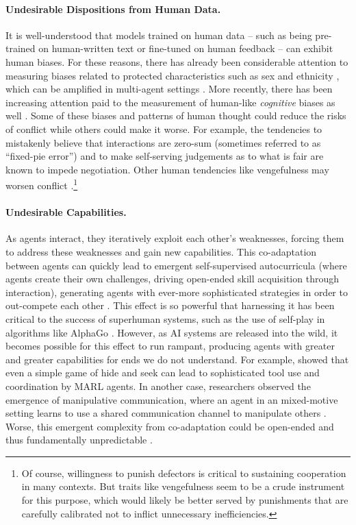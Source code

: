 \paragraph{Undesirable Dispositions from Human Data.}
It is well-understood that models trained on human data -- such as being pre-trained on human-written text or fine-tuned on human feedback -- can exhibit {human biases}.
For these reasons, there has already been considerable attention to measuring biases related to protected characteristics such as sex and ethnicity \citep[e.g.,][]{Nadeem2020-pi,Nangia2020-gl,Liang2021-uh,Ferrara2023-ix}, which can be amplified in multi-agent settings \citep[see also ]{Acerbi2023}.
More recently, there has been increasing attention paid to the measurement of human-like \textit{cognitive} biases as well \citep{Jones2022-or,Itzhak2023-yc,Talboy2023-wd, mazeika2025utilityengineeringanalyzingcontrolling}. 
Some of these biases and patterns of human thought could reduce the risks of conflict while others could make it worse.
For example, the tendencies to mistakenly believe that 
interactions are zero-sum (sometimes referred to 
as ``fixed-pie error'') and to make self-serving 
judgements as to what is fair \citep{Caputo2013-cm} are 
known to impede negotiation.
Other human tendencies like vengefulness \citep{Jackson2019-zp} may worsen conflict \citep{Lowenheim2008-wv}.\footnote{Of course, willingness to punish defectors is critical to sustaining cooperation in many contexts. But traits like vengefulness seem to be a crude instrument for this purpose, which would likely be better served by punishments that are carefully calibrated not to inflict unnecessary inefficiencies.}


\paragraph{Undesirable Capabilities.}
As agents interact, they iteratively exploit each other's weaknesses, forcing them to address these weaknesses and gain new capabilities. This co-adaptation between agents can quickly lead to emergent self-supervised autocurricula (where agents create their own challenges, driving open-ended skill acquisition through interaction), generating agents with ever-more sophisticated strategies in order to out-compete each other \citep{leibo2019autocurricula}. This effect is so powerful that harnessing it has been critical to the success of superhuman systems, such as the use of self-play in algorithms like AlphaGo \citep{Silver2016}.
However, as AI systems are released into the wild, it becomes possible for this effect to run rampant, producing agents with greater and greater capabilities for ends we do not understand. 
For example, \citet{Baker2019} showed that even a simple game of hide and seek can lead to sophisticated tool use and coordination by MARL agents. 
In another case, researchers observed the emergence of manipulative communication, where an agent in an mixed-motive setting learns to use a shared communication channel to manipulate others \citep{blumenkamp2021emergence}. Worse, this emergent complexity from co-adaptation could be open-ended and thus fundamentally unpredictable \citep{hughes2024open}.


